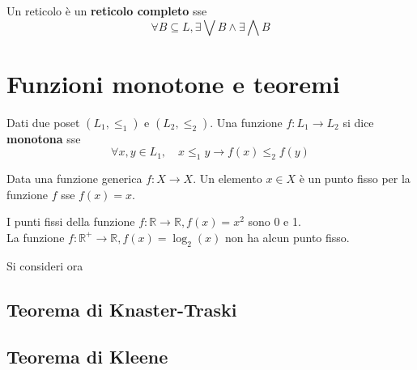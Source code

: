 \begin{defn}
    Un reticolo è un \textbf{reticolo completo} sse
    \[
        \forall B \subseteq L, \exists \bigvee B \land \exists \bigwedge B
    \]
\end{defn}

\section{Funzioni monotone e teoremi}
\begin{defn}
    Dati due poset $(L_1, \le_1)$ e $(L_2, \le_2)$.
    Una funzione $f: L_1 \rightarrow L_2$ si dice \textbf{monotona} sse
    \[
        \forall x,y \in L_1, \quad x \le_1 y \rightarrow f(x) \le_2 f(y)
    \]
\end{defn}

\begin{defn}
    Data una funzione generica $f: X \rightarrow X$.
    Un elemento $x \in X$ è un punto fisso per la funzione $f$ sse $f(x) = x$.
\end{defn}

\begin{exmp}
    I punti fissi della funzione $f: \mathbb{R} \rightarrow \mathbb{R}, f(x) = x^2$
    sono 0 e 1.\\
    La funzione $f: \mathbb{R}^+ \rightarrow \mathbb{R}, f(x) = \log_2(x)$
    non ha alcun punto fisso.
\end{exmp}

Si consideri ora

\subsection{Teorema di Knaster-Traski}

\subsection{Teorema di Kleene}
